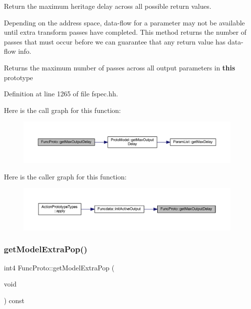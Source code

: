 Return the maximum heritage delay across all possible return values. 

Depending on the address space, data-\/flow for a parameter may not be available until extra transform passes have completed. This method returns the number of passes that must occur before we can guarantee that any return value has data-\/flow info. \begin{DoxyReturn}{Returns}
the maximum number of passes across all output parameters in {\bfseries{this}} prototype 
\end{DoxyReturn}


Definition at line 1265 of file fspec.\+hh.

Here is the call graph for this function\+:
\nopagebreak
\begin{figure}[H]
\begin{center}
\leavevmode
\includegraphics[width=350pt]{class_func_proto_a79cb1fac9b0d2d2c55d3ff4fa7db5c27_cgraph}
\end{center}
\end{figure}
Here is the caller graph for this function\+:
\nopagebreak
\begin{figure}[H]
\begin{center}
\leavevmode
\includegraphics[width=350pt]{class_func_proto_a79cb1fac9b0d2d2c55d3ff4fa7db5c27_icgraph}
\end{center}
\end{figure}
\mbox{\label{class_func_proto_a36076943e0845125efffbd7d1d1e46ef}} 
\subsubsection{\texorpdfstring{getModelExtraPop()}{getModelExtraPop()}}
{\footnotesize\ttfamily int4 Func\+Proto\+::get\+Model\+Extra\+Pop (\begin{DoxyParamCaption}\item[{void}]{ }\end{DoxyParamCaption}) const\hspace{0.3cm}{\ttfamily [inline]}}



